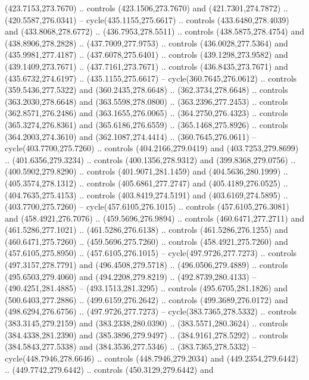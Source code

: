 \begin{scope}[cm={{1.25,0.0,0.0,-1.25,(0.0,743.43331)}}]
    (423.7153,273.7670) .. controls (423.1506,273.7670) and (421.7301,274.7872) ..
    (420.5587,276.0341) -- cycle(435.1155,275.6617) .. controls
    (433.6480,278.4039) and (433.8068,278.6772) .. (436.7953,278.5511) .. controls
    (438.5875,278.4754) and (438.8906,278.2828) .. (437.7009,277.9753) .. controls
    (436.0028,277.5364) and (435.9981,277.4187) .. (437.6078,275.6401) .. controls
    (439.1298,273.9582) and (439.1409,273.7671) .. (437.7161,273.7671) .. controls
    (436.8435,273.7671) and (435.6732,274.6197) .. (435.1155,275.6617) --
    cycle(360.7645,276.0612) .. controls (359.5436,277.5322) and
    (360.2435,278.6648) .. (362.3734,278.6648) .. controls (363.2030,278.6648) and
    (363.5598,278.0800) .. (363.2396,277.2453) .. controls (362.8571,276.2486) and
    (363.1655,276.0065) .. (364.2750,276.4323) .. controls (365.3274,276.8361) and
    (365.6186,276.6559) .. (365.1468,275.8926) .. controls (364.2003,274.3610) and
    (362.1087,274.4414) .. (360.7645,276.0611) -- cycle(403.7700,275.7260) ..
    controls (404.2166,279.0419) and (403.7253,279.8699) .. (401.6356,279.3234) ..
    controls (400.1356,278.9312) and (399.8368,279.0756) .. (400.5902,279.8290) ..
    controls (401.9071,281.1459) and (404.5636,280.1999) .. (405.3574,278.1312) ..
    controls (405.6861,277.2747) and (405.4189,276.0525) .. (404.7635,275.4153) ..
    controls (403.8419,274.5191) and (403.6169,274.5895) .. (403.7700,275.7260) --
    cycle(457.6105,276.1015) .. controls (457.6105,276.3081) and
    (458.4921,276.7076) .. (459.5696,276.9894) .. controls (460.6471,277.2711) and
    (461.5286,277.1021) .. (461.5286,276.6138) .. controls (461.5286,276.1255) and
    (460.6471,275.7260) .. (459.5696,275.7260) .. controls (458.4921,275.7260) and
    (457.6105,275.8950) .. (457.6105,276.1015) -- cycle(497.9726,277.7273) ..
    controls (497.3157,278.7791) and (496.4508,279.5718) .. (496.0506,279.4889) ..
    controls (495.6503,279.4060) and (494.2208,279.8219) .. (492.8739,280.4133) --
    (490.4251,281.4885) -- (493.1513,281.3295) .. controls (495.6705,281.1826) and
    (500.6403,277.2886) .. (499.6159,276.2642) .. controls (499.3689,276.0172) and
    (498.6294,276.6756) .. (497.9726,277.7273) -- cycle(383.7365,278.5332) ..
    controls (383.3145,279.2159) and (383.2338,280.0390) .. (383.5571,280.3624) ..
    controls (384.4338,281.2390) and (385.3896,279.9497) .. (384.9161,278.5292) ..
    controls (384.5843,277.5338) and (384.3536,277.5346) .. (383.7365,278.5332) --
    cycle(448.7946,278.6646) .. controls (448.7946,279.2034) and
    (449.2354,279.6442) .. (449.7742,279.6442) .. controls (450.3129,279.6442) and

\end{scope}

